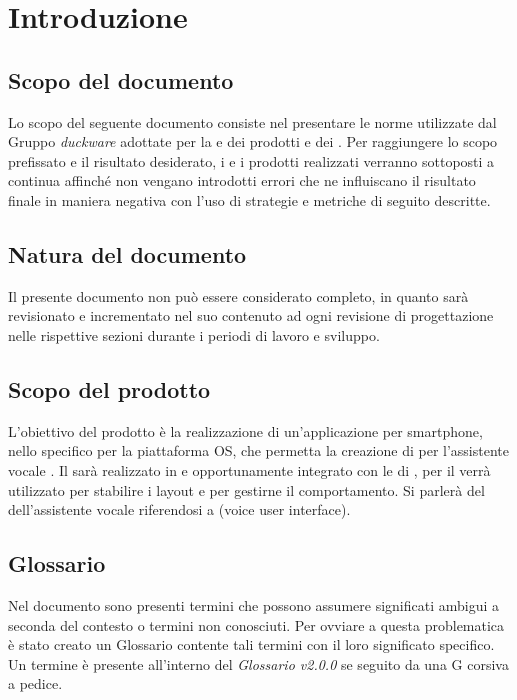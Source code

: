 \clearpage
\section{Introduzione}
\label{sec:intro}
\subsection{Scopo del documento}
Lo scopo del seguente documento consiste nel presentare le norme utilizzate dal Gruppo \emph{duckware} adottate per la  e  dei prodotti e dei . Per raggiungere lo scopo prefissato e il risultato desiderato, i  e i prodotti realizzati verranno sottoposti a  continua affinché non vengano introdotti errori che ne influiscano il risultato finale in maniera negativa con l'uso di strategie e metriche di seguito descritte.
\subsection{Natura del documento}
Il presente documento non può essere considerato completo, in quanto sarà revisionato e incrementato nel suo contenuto ad ogni revisione di progettazione nelle rispettive sezioni durante i periodi di lavoro e sviluppo.
\subsection{Scopo del prodotto}
L'obiettivo del prodotto è la realizzazione di un'applicazione per smartphone, nello specifico per la piattaforma  OS, che permetta la creazione di  per l'assistente vocale  .\newline
Il  sarà realizzato in  e opportunamente integrato con le  di , per il  verrà utilizzato  per stabilire i layout e  per gestirne il comportamento. Si parlerà del  dell'assistente vocale riferendosi a  (voice user interface).
\subsection{Glossario}
Nel documento sono presenti termini che possono assumere significati ambigui a seconda del contesto o termini non conosciuti. Per ovviare a questa problematica è stato creato un Glossario contente tali termini con il loro significato specifico. Un termine è presente all'interno del \emph{Glossario v2.0.0} se seguito da una G corsiva a pedice.
